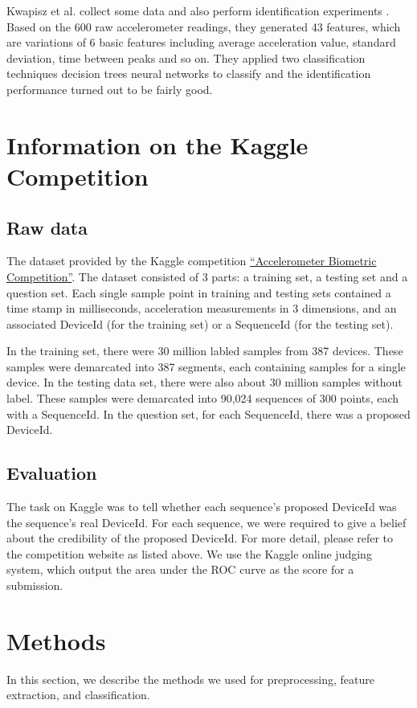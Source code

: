 \documentclass{article} %
\begin{document}
Kwapisz et al.\cite{Kwapisz:BTAS2009} collect some data and also perform identification experiments . Based on the 600 raw accelerometer readings, they generated 43 features, which are variations of 6 basic features including average acceleration value, standard deviation, time between peaks and so on. They applied two classification techniques decision trees neural networks to classify and the identification performance turned out to be fairly good.


\section{Information on the Kaggle Competition}
\subsection{Raw data}
The dataset provided by the Kaggle competition \href{http://www.kaggle.com/c/accelerometer-biometric-competition}{``Accelerometer Biometric Competition''}. The dataset consisted of 3 parts: a training set, a testing set and a question set. Each single sample point in training and testing sets contained a time stamp in milliseconds, acceleration measurements in 3 dimensions, and an associated DeviceId (for the training set) or a SequenceId (for the testing set). 

In the training set, there were 30 million labled samples from 387 devices. These samples were demarcated into 387 segments, each containing samples for a single device. In the testing data set, there were also about 30 million samples without label. These samples were demarcated into 90,024 sequences of 300 points, each with a SequenceId. In the question set, for each SequenceId, there was a proposed DeviceId.

\subsection{Evaluation}
The task on Kaggle was to tell whether each sequence's proposed DeviceId was the sequence's real DeviceId. For each sequence, we were required to give a belief about the credibility of the proposed DeviceId. For more detail, please refer to the competition website as listed above. We use the Kaggle online judging system, which output the area under the ROC curve as the score for a submission.

\section{Methods}
In this section, we describe the methods we used for preprocessing, feature extraction, and classification.
\end{document}
